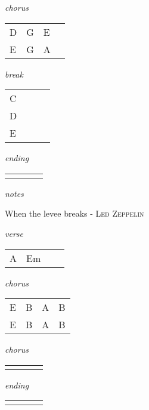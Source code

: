 \documentclass[12pt]{article}
\begin{document}
\textit{chorus}

\begin{tabular}{|P{1.25in}|P{1.25in}|P{1.25in}|P{1.25in}|}
   D & G  & E  &   \\
   E  &  G  & A  &  \\

\end{tabular}

\textit{break}

\begin{tabular}{|P{1.25in}|P{1.25in}|P{1.25in}|P{1.25in}|}
  C  &   &   &   \\
  D  &   &   &   \\
  E  &   &   &   \\
\end{tabular}

\textit{ending}

\begin{tabular}{|P{1.25in}|P{1.25in}|P{1.25in}|P{1.25in}|}
    &   &   &   \\
\end{tabular}

\textit{notes}

\newpage
{\Huge When the levee breaks} {\huge - \textsc{Led Zeppelin}}

\huge
\textit{verse}

\begin{tabular}{|P{1.25in}|P{1.25in}|P{1.25in}|P{1.25in}|}
  A  &  Em &   &   \\
\end{tabular}

\textit{chorus}

\begin{tabular}{|P{1.25in}|P{1.25in}|P{1.25in}|P{1.25in}|}
  E  &  B &  A &  B \\
  E  &  B  &  A  &  B  \\
\end{tabular}

\textit{chorus}

\begin{tabular}{|P{1.25in}|P{1.25in}|P{1.25in}|P{1.25in}|}
    &   &   &   \\
\end{tabular}

\textit{ending}

\begin{tabular}{|P{1.25in}|P{1.25in}|P{1.25in}|P{1.25in}|}
    &   &   &   \\
\end{tabular}
\end{document}
